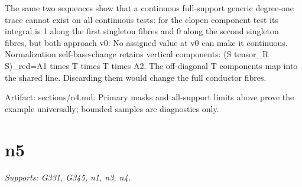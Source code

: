 \documentclass[11pt]{article}
\begin{document}
\begin{ReviewBody}
The same two sequences show that a continuous full-support generic degree-one trace cannot exist on all continuous tests: for the clopen component test its integral is 1 along the first singleton fibres and 0 along the second singleton fibres, but both approach v0. No assigned value at v0 can make it continuous. Normalization self-base-change retains vertical components:
  (S tensor_R S)_red=A1 times T times T times A2.
The off-diagonal T components map into the shared line. Discarding them would change the full conductor fibres.

Artifact: sections/n4.md. Primary masks and all-support limits above prove the example universally; bounded samples are diagnostics only.
\end{ReviewBody}

\section{n5}
\textit{Supports: G331, G345, n1, n3, n4.}
\end{document}
